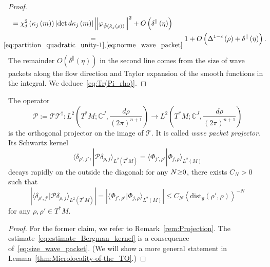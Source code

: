 \documentclass[10pt]{amsart}
\theoremstyle{definition}\newtheorem{defi}[theo]{Definition}\newtheorem{rema}[theo]{Remark}\newtheorem{exam}[theo]{Example}\newtheorem{exem}[theo]{Example}\newtheorem{nota}[theo]{Notation}
\newcommand{\clT}{\mathcal{T}}
\newcommand{\clP}{\mathcal{P}}
\newcommand{\dist}{\mathrm{dist}}
\newcommand{\bbC}{\mathbb{C}}
\let\oldtilde\tilde
\renewcommand*{\tilde}[1]{\mathchoice{\widetilde{#1}}{\widetilde{#1}}{\oldtilde{#1}}{\oldtilde{#1}}}
\begin{document}
\begin{proof}
\begin{align*}
& \mkern6mu= \chi_{j}^{2}\left(\kappa_{j}\left(m\right)\right)\left|\det d\kappa_{j}\left(m\right)\right|\left\Vert \varphi_{\tilde{\psi}\left(\tilde{\kappa}_{j}\left(\rho\right)\right)}\right\Vert ^{2}+O\left(\delta^{\parallel}\left(\eta\right)\right)\\
& \mkern-18mu\underset{\eqref{eq:partition_quadratic_unity-1},\eqref{eq:norme_wave_packet}}{=} 1+O\left(\Delta^{1-\epsilon}\left(\rho\right)+\delta^{\parallel}\left(\eta\right)\right).
\end{align*}
The remainder $O(\delta^{\parallel}(\eta))$ in the second line comes from the size of wave packets along the flow direction and Taylor expansion of the smooth functions in the integral. We deduce~\eqref{eq:Tr(Pi_rho)}.
\end{proof}

\begin{cBoxB}{}
\begin{prop}\label{lem:Bargmann projector}
The operator
\begin{equation}\label{eq:BargmannProjector}
\clP :=\clT\clT^{\dagger}:L^{2}\left(T^{*}M;\bbC^{J},\frac{d\rho}{\left(2\pi\right)^{n+1}}\right)\rightarrow L^{2}\left(T^{*}M;\bbC^{J},\frac{d\rho}{\left(2\pi\right)^{n+1}}\right)
\end{equation}
is the orthogonal projector on the image of $\clT$. It is called \emph{wave packet projector}. Its Schwartz kernel
\begin{equation}\label{eq:kernel_T_T*}
\langle\delta_{\rho',j'},|\clP \delta_{\rho,j}\rangle_{L^{2}\left(T^{*}M\right)}=\langle\Phi_{j',\rho'}|\Phi_{j,\rho}\rangle_{L^{2}\left(M\right)}
\end{equation}
decays rapidly on the outside the diagonal: for any $N\text{\ensuremath{\ge}0}$, there exists $C_{N}>0$ such that
\begin{equation}\label{eq:estimate_Bergman_kernel}
\left|\langle\delta_{\rho',j'}|\clP \delta_{\rho,j}\rangle_{L^{2}\left(T^{*}M\right)}\right|=\left|\langle\Phi_{j',\rho'}|\Phi_{j,\rho}\rangle_{L^{2}\left(M\right)}\right|\leq C_{N}\left\langle \dist_{g}\left(\rho',\rho\right)\right\rangle ^{-N}
\end{equation}
for any $\rho,\rho'\in T^{*}M$.
\end{prop}
\end{cBoxB}

\begin{proof}
For the former claim, we refer to Remark~\ref{rem:Projection}. The estimate~\eqref{eq:estimate_Bergman_kernel} is a consequence of~\eqref{eq:size_wave_packet}. (We will show a more general statement in Lemma~\ref{thm:Microlocality-of-the_TO}.)
\end{proof}
\end{document}
